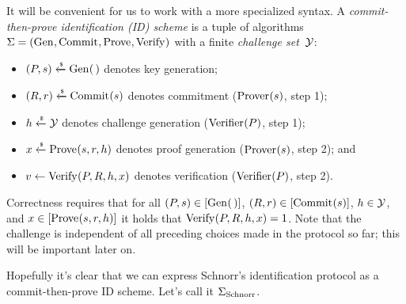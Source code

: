 \documentclass{article}
\theoremstyle{remark}
\begin{document}
It will be convenient for us to work with a more specialized syntax. A
\emph{commit-then-prove identification (ID) scheme} is a tuple of algorithms $\Sigma =
(\gen,\commit,\prove,\verify)$ with a finite \emph{challenge set~$\Y$}:
\begin{itemize}
  \item $(P,s)\getsr\gen(\,)$ denotes key generation;
  \item $(R,r)\getsr\commit(s)$ denotes commitment ($\prover(s)$, step 1);
  \item $h\getsr\Y$ denotes challenge generation ($\verifier(P)$, step 1);
  \item $x\getsr\prove(s,r,h)$ denotes proof generation ($\prover(s)$, step 2); and
  \item $v\gets\verify(P,R,h,x)$ denotes verification ($\verifier(P)$, step 2).
\end{itemize}
%
Correctness requires that for all $(P,s)\in[\gen(\,)]$, $(R,r)\in[\commit(s)]$,
$h\in\Y$, and $x\in[\prove(s,r,h)]$ it holds that
$\verify(P,R,h,x)=1$.
%
Note that the challenge is independent of all preceding choices made in the
protocol so far; this will be important later on.

Hopefully it's clear that we can express Schnorr's identification protocol as a
commit-then-prove ID scheme. Let's call it $\Schnorr$.
\end{document}
